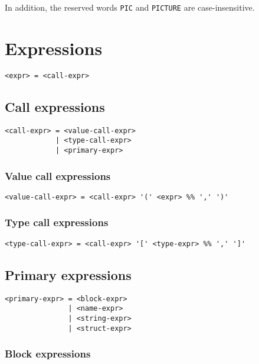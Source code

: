 \documentclass[12pt, oneside]{memoir}
\begin{document}
In addition, the reserved words \texttt{PIC} and \texttt{PICTURE} are
case-insensitive.

\chapter{Expressions}

\begin{verbatim}
<expr> = <call-expr>
\end{verbatim}

\section{Call expressions}

\begin{verbatim}
<call-expr> = <value-call-expr>
            | <type-call-expr>
            | <primary-expr>
\end{verbatim}

\subsection{Value call expressions}

\begin{verbatim}
<value-call-expr> = <call-expr> '(' <expr> %% ',' ')'
\end{verbatim}

\subsection{Type call expressions}

\begin{verbatim}
<type-call-expr> = <call-expr> '[' <type-expr> %% ',' ']'
\end{verbatim}

\section{Primary expressions}

\begin{verbatim}
<primary-expr> = <block-expr>
               | <name-expr>
               | <string-expr>
               | <struct-expr>
\end{verbatim}

\subsection{Block expressions}
\end{document}
